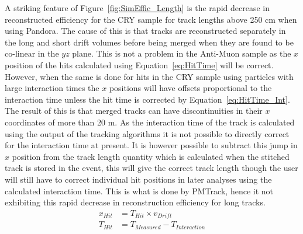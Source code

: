 A striking feature of Figure~\ref{fig:SimEffic_Length} is the rapid decrease in reconstructed efficiency for the CRY sample for track lengths above 250 cm when using Pandora. The cause of this is that tracks are reconstructed separately in the long and short drift volumes before being merged when they are found to be co-linear in the $yz$ plane. This is not a problem in the Anti-Muon sample as the $x$ position of the hits calculated using Equation~\ref{eq:HitTime} will be correct. However, when the same is done for hits in the CRY sample using particles with large interaction times the $x$ positions will have offsets proportional to the interaction time unless the hit time is corrected by Equation~\ref{eq:HitTime_Int}. The result of this is that merged tracks can have discontinuities in their $x$ coordinates of more than 20 m. As the interaction time of the track is calculated using the output of the tracking algorithms it is not possible to directly correct for the interaction time at present. It is however possible to subtract this jump in $x$ position from the track length quantity which is calculated when the stitched track is stored in the event, this will give the correct track length though the user will still have to correct individual hit positions in later analyses using the calculated interaction time. This is what is done by PMTrack, hence it not exhibiting this rapid decrease in reconstruction efficiency for long tracks. \\

\begin{subequations} \begin{align}
  x_{Hit} &= T_{Hit} \times v_{Drift} \label{eq:HitTime} \\
  T_{Hit} &= T_{Measured} - T_{Interaction} \label{eq:HitTime_Int}
\end{align} \end{subequations}

